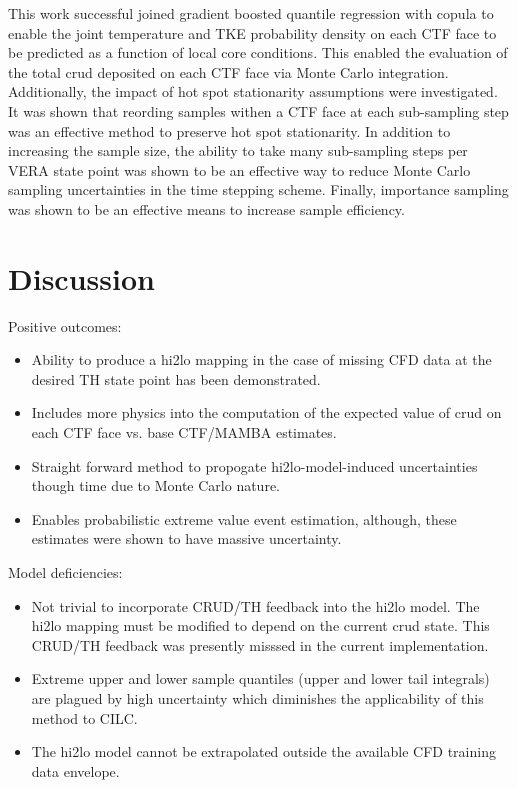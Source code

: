 
This work successful joined gradient boosted quantile regression with copula to enable the joint temperature and TKE probability density on each CTF face to be predicted as a function of local core conditions.  This enabled the evaluation of the total crud deposited on each CTF face via Monte Carlo integration.  Additionally, the impact of hot spot stationarity assumptions were investigated.  It was shown that reording samples withen a CTF face at each sub-sampling step was an effective method to preserve hot spot stationarity.  In addition to increasing the sample size, the ability to take many sub-sampling steps per VERA state point was shown to be an effective way to reduce Monte Carlo sampling uncertainties in the time stepping scheme.  Finally, importance sampling was shown to be an effective means to increase sample efficiency.

\section{Discussion}

Positive outcomes:

\begin{itemize}
	\item  Ability to produce a hi2lo mapping in the case of missing CFD data at the desired TH state point has been demonstrated.
	\item  Includes more physics into the computation of the expected value of crud on each CTF face vs. base CTF/MAMBA estimates.
	\item  Straight forward method to propogate hi2lo-model-induced uncertainties though time due to Monte Carlo nature.
	\item  Enables probabilistic extreme value event estimation, although, these estimates were shown to have massive uncertainty.
\end{itemize}

\noindent Model deficiencies:  

\begin{itemize}
	\item  Not trivial to incorporate CRUD/TH feedback into the hi2lo model.  The hi2lo mapping must be modified to depend on the current crud state.  This CRUD/TH feedback was presently misssed in the current implementation.
	\item  Extreme upper and lower sample quantiles (upper and lower tail integrals) are plagued by high uncertainty which diminishes the applicability of this method to CILC.  
    \item  The hi2lo model cannot be extrapolated outside the available CFD training data envelope.
\end{itemize}


